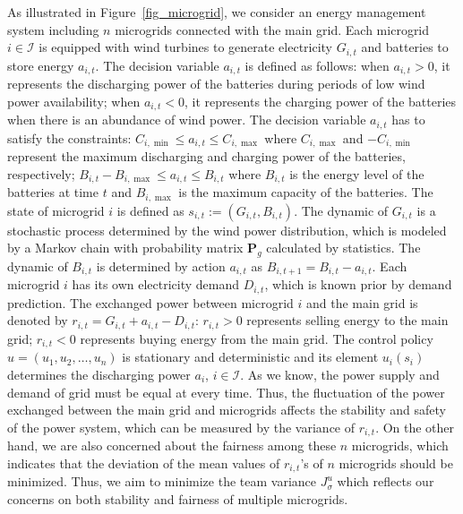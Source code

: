 \documentclass[12pt]{article}
\begin{document}
As illustrated in Figure~\ref{fig_microgrid}, we consider an energy
management system including $n$ microgrids connected with the main
grid. Each microgrid $i \in \mathcal I$ is equipped with wind
turbines to generate electricity $G_{i,t}$ and batteries to store
energy $a_{i,t}$. The decision variable $a_{i,t}$ is defined as
follows: when $a_{i,t} > 0$, it represents the discharging power of
the batteries during periods of low wind power availability; when
$a_{i,t} < 0$, it represents the charging power of the batteries
when there is an abundance of wind power. The decision variable
$a_{i,t}$ has to satisfy the constraints: $C_{i,\min} \leq a_{i,t}
\leq C_{i,\max}$ where $C_{i,\max}$ and $-C_{i,\min}$ represent the
maximum discharging and charging power of the batteries,
respectively; $B_{i,t} - B_{i,\max} \leq a_{i,t} \leq B_{i,t}$ where
$B_{i,t}$ is the energy level of the batteries at time $t$ and
$B_{i,\max}$ is the maximum capacity of the batteries. The state of
microgrid $i$ is defined as $s_{i,t}:=(G_{i,t}, B_{i,t})$. The
dynamic of $G_{i,t}$ is a stochastic process determined by the wind
power distribution, which is modeled by a Markov chain with
probability matrix $\bm P_g$ calculated by statistics. The dynamic
of $B_{i,t}$ is determined by action $a_{i,t}$ as
$B_{i,t+1}=B_{i,t}-a_{i,t}$. Each microgrid $i$ has its own
electricity demand $D_{i,t}$, which is known prior by demand
prediction. The exchanged power between microgrid $i$ and the main
grid is denoted by $r_{i,t}=G_{i,t}+a_{i,t}-D_{i,t}$: $r_{i,t}>0$
represents selling energy to the main grid; $r_{i,t}<0$ represents
buying energy from the main grid. The control policy
$u=(u_1,u_2,\dots,u_n)$ is stationary and deterministic and its
element $u_i(s_{i})$ determines the discharging power $a_{i}$, $i
\in \mathcal I$. As we know, the power supply and demand of grid
must be equal at every time. Thus, the fluctuation of the power
exchanged between the main grid and microgrids affects the stability
and safety of the power system, which can be measured by the
variance of $r_{i,t}$. On the other hand, we are also concerned
about the fairness among these $n$ microgrids, which indicates that
the deviation of the mean values of $r_{i,t}$'s of $n$ microgrids
should be minimized. Thus, we aim to minimize the team variance
$J^{u}_{\sigma}$ which reflects our concerns on both stability and
fairness of multiple microgrids.
\end{document}
